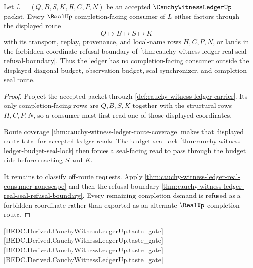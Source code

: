 \begin{theorem}
\label{thm:cauchy-witness-ledger-real-seal-consumer-totality}
Let $L=(Q,B,S,K,H,C,P,N)$ be an accepted
$\CauchyWitnessLedgerUp$ packet. Every $\RealUp$ completion-facing consumer of
$L$ either factors through the displayed route
$$
Q \longmapsto B \longmapsto S \longmapsto K
$$
with its transport, replay, provenance, and local-name rows $H,C,P,N$, or lands
in the forbidden-coordinate refusal boundary of
\autoref{thm:cauchy-witness-ledger-real-seal-refusal-boundary}. Thus the ledger
has no completion-facing consumer outside the displayed diagonal-budget,
observation-budget, seal-synchronizer, and completion-seal route.
\end{theorem}
\begin{proof}
Project the accepted packet through
\autoref{def:cauchy-witness-ledger-carrier}. Its only completion-facing rows are
$Q,B,S,K$ together with the structural rows $H,C,P,N$, so a consumer must first
read one of those displayed coordinates.

Route coverage \autoref{thm:cauchy-witness-ledger-route-coverage} makes that
displayed route total for accepted ledger reads. The budget-seal lock
\autoref{thm:cauchy-witness-ledger-budget-seal-lock} then forces a seal-facing
read to pass through the budget side before reaching $S$ and $K$.

It remains to classify off-route requests. Apply
\autoref{thm:cauchy-witness-ledger-real-consumer-nonescape} and then the
refusal boundary
\autoref{thm:cauchy-witness-ledger-real-seal-refusal-boundary}. Every remaining
completion demand is refused as a forbidden coordinate rather than exported as
an alternate $\RealUp$ completion route.
\end{proof}






[BEDC.Derived.CauchyWitnessLedgerUp.taste\_gate]
[BEDC.Derived.CauchyWitnessLedgerUp.taste\_gate]
[BEDC.Derived.CauchyWitnessLedgerUp.taste\_gate]
[BEDC.Derived.CauchyWitnessLedgerUp.taste\_gate]
